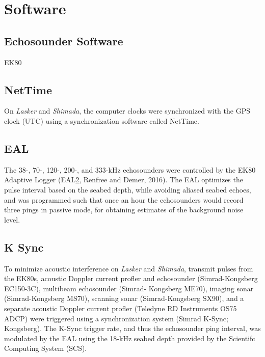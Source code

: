 \documentclass[
  letterpaper,
  oneside,
  open=any]{scrbook}
\begin{document}
\section{Software}\label{software}

\subsection{Echosounder Software}\label{echosounder-software}

EK80

\subsection{NetTime}\label{nettime}

On \emph{Lasker} and \emph{Shimada}, the computer clocks were
synchronized with the GPS clock (UTC) using a synchronization software
called NetTime.

\subsection{EAL}\label{eal}

The 38-, 70-, 120-, 200-, and 333-kHz echosounders were controlled by
the EK80 Adaptive Logger
(EAL\href{file:///C:/Users/alice.beittel/Downloads/2024Renfree.docx\#_bookmark7}{2},
Renfree and Demer, 2016). The EAL optimizes the pulse interval based on
the seabed depth, while avoiding aliased seabed echoes, and was
programmed such that once an hour the echosounders would record three
pings in passive mode, for obtaining estimates of the background noise
level.

\subsection{K Sync}\label{k-sync}

To minimize acoustic interference on \emph{Lasker} and \emph{Shimada},
transmit pulses from the EK80s, acoustic Doppler current profler and
echosounder (Simrad-Kongsberg EC150-3C), multibeam echosounder (Simrad-
Kongsberg ME70), imaging sonar (Simrad-Kongsberg MS70), scanning sonar
(Simrad-Kongsberg SX90), and a separate acoustic Doppler current profler
(Teledyne RD Instruments OS75 ADCP) were triggered using a
synchronization system (Simrad K-Sync; Kongsberg). The K-Sync trigger
rate, and thus the echosounder ping interval, was modulated by the EAL
using the 18-kHz seabed depth provided by the Scientifc Computing System
(SCS).
\end{document}
